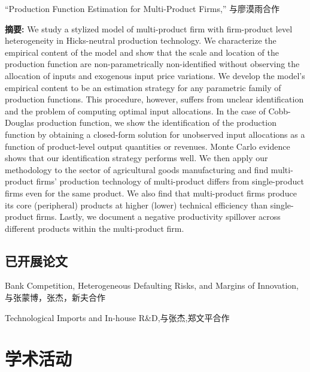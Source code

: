 \documentclass[letterpaper]{article}
\begin{document}
{ \vspace{0.05in}
 “Production Function Estimation for Multi-Product Firms,” 与廖漠雨合作
     \vspace{0.05in}
 \begin{center}
 \begin{minipage}{0.9\linewidth}
   \textbf{摘要:} We study a stylized model of multi-product firm with firm-product level heterogeneity in Hicks-neutral production technology. We characterize the empirical content of the model and show that the scale and location of the production function are non-parametrically non-identified without observing the allocation of inputs and exogenous input price variations. We develop the model's empirical content to be an estimation strategy for any parametric family of production functions. This procedure, however, suffers from unclear identification and the problem of computing optimal input allocations. In the case of Cobb-Douglas production function, we show the identification of the production function by obtaining a closed-form solution for unobserved input allocations as a function of product-level output quantities or revenues. Monte Carlo evidence shows that our identification strategy performs well. We then apply our methodology to the sector of agricultural goods manufacturing and find multi-product firms' production technology of multi-product differs from single-product firms even for the same product. We also find that multi-product firms produce its core (peripheral) products at higher (lower) technical efficiency than single-product firms. Lastly, we document a negative productivity spillover across different products within the multi-product firm.
 \end{minipage}
 \end{center}
  \vspace{0.05in}



\subsection*{\bf{已开展论文}}
 Bank Competition, Heterogeneous Defaulting Risks, and Margins of Innovation, 与张蒙博，张杰，新夫合作


\vspace{0.5em}
Technological Imports and In-house R\&D,与张杰,郑文平合作

\section*{\textsc{学术活动}}

}
\end{document}
